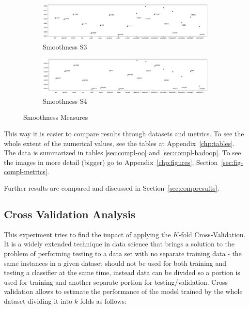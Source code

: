 \begin{figure}[h!]\ContinuedFloat
    \centering
    \begin{subfigure}{0.496\textwidth}
        \includegraphics[width=0.99\textwidth]{figures/smoothness-S3.png}
        \caption{Smoothness S3}
        \label{fig:smoothness-s3}
    \end{subfigure}
    \begin{subfigure}{0.496\textwidth}
        \includegraphics[width=0.99\textwidth]{figures/smoothness-S4.png}
        \caption{Smoothness S4}
        \label{fig:smoothness-s4}
    \end{subfigure}
    \caption{Smoothness Measures}
    \label{fig:smoothness}
\end{figure}

This way it is easier to compare results through datasets and metrics. To see 
the whole extent of the numerical values, see the tables at 
Appendix~\ref{chp:tables}. The data is summarized in tables \ref{sec:compl-oo} 
and \ref{sec:compl-hadoop}. To see the images in more detail (bigger) go to 
Appendix~\ref{chp:figures}, Section~\ref{sec:fig-compl-metrics}.

Further results are compared and discussed in Section~\ref{sec:compresults}.

\newpage

\subsection{Cross Validation Analysis}\label{sec:exp-kfold}

This experiment tries to find the impact of applying the $K$-fold 
Cross-Validation. It is a widely extended technique in data science that brings 
a solution to the problem of performing testing to a data set with no separate 
training data - the same instances in a given dataset should not be used for 
both training and testing a classifier at the same time, instead data can be 
divided so a portion is used for training and another separate portion for 
testing/validation. Cross validation allows to estimate the performance of the 
model trained by the whole dataset dividing it into $k$ folds as follows:

